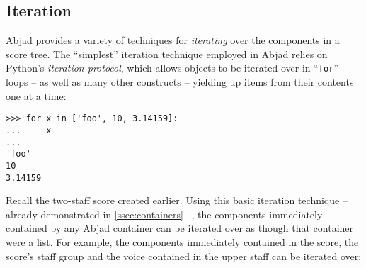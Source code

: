 \noindent

\subsection{Iteration}
\label{ssec:iteration}

Abjad provides a variety of techniques for \emph{iterating} over the components
in a score tree. The \enquote{simplest} iteration technique employed in Abjad
relies on Python's \emph{iteration protocol}, which allows objects to be
iterated over in \enquote{\texttt{for}} loops -- as well as many other
constructs -- yielding up items from their contents one at a time:

\begin{comment}
<abjad>
for x in ['foo', 10, 3.14159]:
    x

</abjad>
\end{comment}

\begin{abjadbookoutput}
\begin{singlespacing}
\vspace{-0.5\baselineskip}
\begin{verbatim}
>>> for x in ['foo', 10, 3.14159]:
...     x
...
'foo'
10
3.14159
\end{verbatim}
\end{singlespacing}
\end{abjadbookoutput}

\noindent Recall the two-staff score created earlier. Using this basic
iteration technique -- already demonstrated in \autoref{ssec:containers} --,
the components immediately contained by any Abjad container can be iterated
over as though that container were a list. For example, the components
immediately contained in the score, the score's staff group and the voice
contained in the upper staff can be iterated over:

\begin{comment}
<abjad>
show(score)
for component in score:
    component

for component in score['Both Staves']:
    component

for component in score['Voice 1']:
    component

</abjad>
\end{comment}

